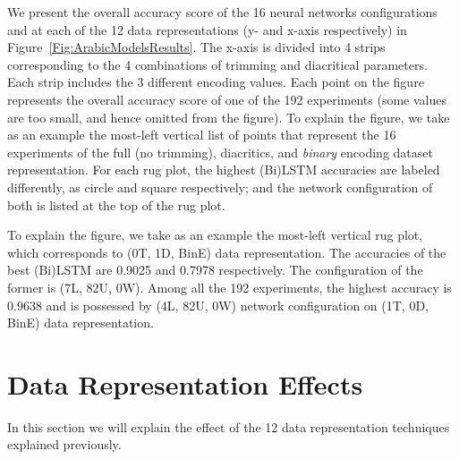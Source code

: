 We present the overall accuracy score of the 16 neural networks configurations and at each of the 12 data representations (y- and x-axis respectively) in Figure~\ref{Fig:ArabicModelsResults}. The x-axis is divided into 4 strips corresponding to the 4 combinations of trimming and diacritical parameters. Each strip includes the 3 different encoding values. Each point on the figure represents the overall accuracy score of one of the 192 experiments (some values are too small, and hence omitted from the figure). To explain the figure, we take as an example the most-left vertical list of points that represent the 16 experiments of the full (no trimming), diacritics, and \textit{binary} encoding dataset representation. For each rug plot, the highest (Bi)LSTM accuracies are labeled differently, as circle and square respectively; and the network configuration of both is listed at the top of the rug plot.

To explain the figure, we take as an example the most-left vertical rug plot, which corresponds to (0T, 1D, BinE) data representation. The accuracies of the best (Bi)LSTM are 0.9025 and 0.7978 respectively. The configuration of the former is (7L, 82U, 0W). Among all the 192 experiments, the highest accuracy is 0.9638 and is possessed by (4L, 82U, 0W) network configuration on (1T, 0D, BinE) data representation.

\section{Data Representation Effects}

In this section we will explain the effect of the 12 data representation techniques explained previously.

